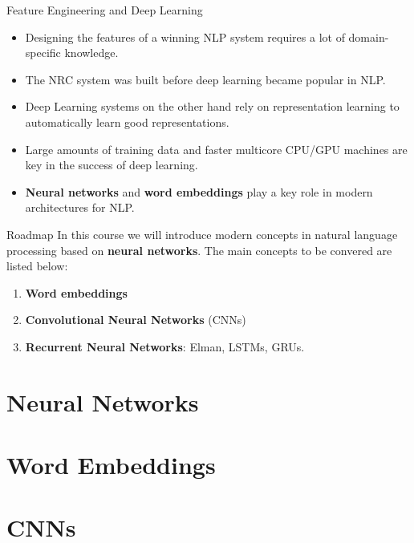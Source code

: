 \documentclass[handout]{beamer}
\begin{document}
\begin{frame}{Feature Engineering and Deep Learning}
\begin{scriptsize}
\begin{itemize}
\item Designing the features of a winning NLP system requires a lot of domain-specific knowledge.
\item The NRC system was built before deep learning became popular in NLP.
\item Deep Learning systems on the other hand rely on representation learning to automatically learn good representations.
\item Large amounts of training data and faster multicore CPU/GPU machines are key in the success of deep learning. 
\item \textbf{Neural networks} and \textbf{word embeddings} play a key role in modern  architectures for NLP.
\end{itemize}
\end{scriptsize}
\end{frame}




\begin{frame}{Roadmap}
In this course we will introduce modern concepts in natural language processing based on \textbf{neural networks}. The main concepts to be convered are listed below:
\begin{scriptsize}
\begin{enumerate}
\item  \textbf{Word embeddings}
\item  \textbf{Convolutional Neural Networks} (CNNs) 
\item \textbf{Recurrent Neural Networks}: Elman, LSTMs, GRUs. 
\end{enumerate} 
\end{scriptsize}
\end{frame}

\section{Neural Networks}



\section{Word Embeddings}


\section{CNNs}

\end{document}
